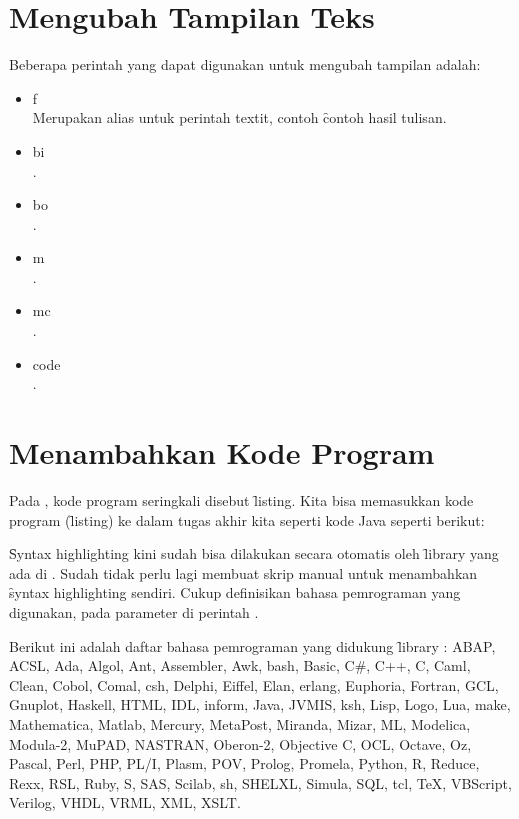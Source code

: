 \section{Mengubah Tampilan Teks}
\label{sec:textFormatting}
Beberapa perintah yang dapat digunakan untuk mengubah tampilan adalah: 
\begin{itemize}
	\item \bslash{}f \\
	Merupakan alias untuk perintah \bslash textit, contoh 
	\f{contoh hasil tulisan}.
	\item \bslash{}bi \\
	.
	\item \bslash{}bo \\
	.
	\item \bslash{}m \\
	.
	\item \bslash{}mc \\
	.
	\item \bslash{}code \\ 
	.
\end{itemize}


\section{Menambahkan Kode Program}
\label{sec:codeListing}
Pada \latex, kode program seringkali disebut \f{listing}. Kita bisa memasukkan kode program (\f{listing}) ke dalam tugas akhir kita seperti kode Java seperti berikut:


\f{Syntax highlighting} kini sudah bisa dilakukan secara otomatis oleh \f{library} yang ada di \latex.
Sudah tidak perlu lagi membuat skrip manual untuk menambahkan \f{syntax highlighting} sendiri.
Cukup definisikan bahasa pemrograman yang digunakan, pada parameter  di perintah .

Berikut ini adalah daftar bahasa pemrograman yang didukung \f{library} : ABAP, ACSL, Ada, Algol, Ant, Assembler, Awk, bash, Basic, C\#, C++, C, Caml, Clean, Cobol, Comal, csh, Delphi, Eiffel, Elan, erlang, Euphoria, Fortran, GCL, Gnuplot, Haskell, HTML, IDL, inform, Java, JVMIS, ksh, Lisp, Logo, Lua, make, Mathematica, Matlab, Mercury, MetaPost, Miranda, Mizar, ML, Modelica, Modula-2, MuPAD, NASTRAN, Oberon-2, Objective C, OCL, Octave, Oz, Pascal, Perl, PHP, PL/I, Plasm, POV, Prolog, Promela, Python, R, Reduce, Rexx, RSL, Ruby, S, SAS, Scilab, sh, SHELXL, Simula, SQL, tcl, TeX, VBScript, Verilog, VHDL, VRML, XML, XSLT. \citep{latex:source_code_listings}

